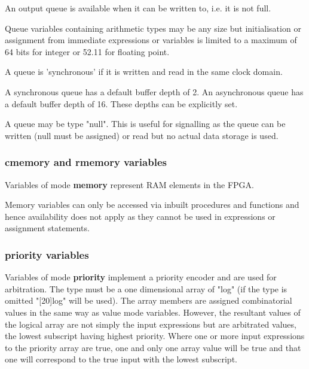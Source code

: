                 An output queue is available when it can be written to, i.e. it is
                not full.

                Queue variables containing arithmetic types may be any size but
                initialisation or assignment from immediate expressions or
                variables is limited to a maximum of 64 bits for integer or
                52.11 for floating point.
                
                A queue is 'synchronous' if it is written and read in the same
                clock domain.
                
                A synchronous queue has a default buffer depth of 2. An
                asynchronous queue has a default buffer depth of 16. These
                depths can be explicitly set.
                
                A queue may be type "null". This is useful for signalling as
                the queue can be written (null must be assigned) or read
                but no actual data storage is used.

            \subsubsection{cmemory and rmemory variables}

                Variables of mode {\bf memory} represent RAM elements in the
                FPGA.

                Memory variables can only be accessed via inbuilt procedures and
                functions and hence availability does not apply as they cannot be
                used in expressions or assignment statements.

           \subsubsection{priority variables}\label{priorityvariables}

                Variables of mode {\bf priority} implement a priority encoder
                and are 
                used for arbitration. The type must be a one dimensional array
                of "log" (if the type is omitted "[20]log" will be used). The
                array members are assigned combinatorial values in the same way
                as value mode variables. However, the resultant values of the
                logical array are not simply the input expressions but are
                arbitrated values, the lowest subscript having highest priority.
                Where one or more input expressions to the priority array are
                true, one and only one array value will be true and that one
                will correspond to the true input with the lowest subscript.

